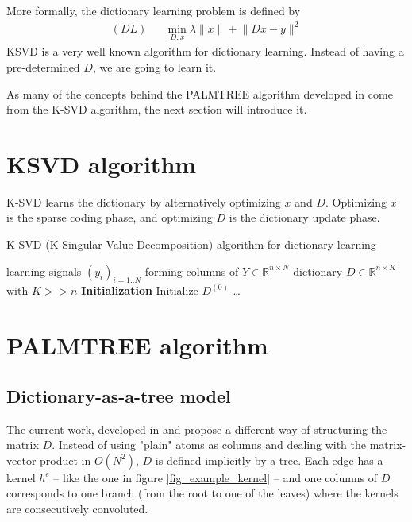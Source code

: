 More formally, the dictionary learning problem is defined by
\begin{equation*}
\begin{aligned}
(DL) && \underset{D,x}{\min} \lambda \lVert x \rVert + \lVert Dx-y \rVert^2
\end{aligned}
\end{equation*}
\ac{KSVD} is a very well known algorithm for dictionary learning. Instead of having a pre-determined $D$, we are going to learn it.

As many of the concepts behind the PALMTREE algorithm developed in \cite{chabiron_optimization_2016} come from the K-SVD algorithm, the next section will introduce it.


\section{\ac{KSVD} algorithm}


K-SVD learns the dictionary by alternatively optimizing $x$ and $D$. Optimizing $x$ is the sparse coding phase, and optimizing $D$ is the dictionary update phase.


\begin{algorithm} %
    \caption{K-SVD (K-Singular Value Decomposition) algorithm for dictionary learning}
  \begin{algorithmic}[1]
    \Input learning signals $(y_i)_{i=1..N}$ forming columns of $Y \in \mathbb{R}^{n \times N}$
    \Output dictionary $D \in \mathbb{R}^{n \times K}$ with $K>>n$
    \State \textbf{Initialization} Initialize $D^{(0)}$
	\State \dots
    \EndWhile
  \end{algorithmic}
\end{algorithm}


\section{PALMTREE algorithm}

\subsection{Dictionary-as-a-tree model}
The current work, developed in \cite{chabiron_toward_2015} and \cite{chabiron_optimization_2016} propose a different way of structuring the matrix $D$. Instead of using "plain" atoms as columns and dealing with the matrix-vector product in $O(N^2)$, $D$ is defined implicitly by a tree. Each edge has a kernel $h^e$ – like the one in figure \ref{fig_example_kernel} – and one columns of $D$ corresponds to one branch (from the root to one of the leaves) where the kernels are consecutively convoluted.


